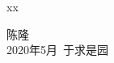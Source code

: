 \begin{thanks}
xx

\begin{flushright}
	\begin{minipage}{12em}
	\begin{center}
		陈隆
		\\ 2020年5月\ 于求是园
	\end{center}
	\end{minipage}
\end{flushright}

\end{thanks}
